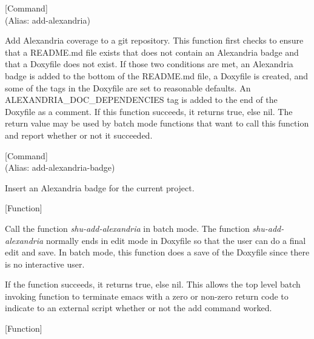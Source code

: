 \vspace{1em}
\noindent
{}
\usebox{\funcname}
 \hfill [Command]\\%
 (Alias: add-alexandria)

\begin{doc-string}
Add Alexandria coverage to a git repository.
This function first checks to ensure that a README.md file exists that does not
contain an Alexandria badge and that a Doxyfile does not exist.  If those two
conditions are met, an Alexandria badge is added to the bottom of the README.md
file, a Doxyfile is created, and some of the tags in the Doxyfile are set to
reasonable defaults.  An ALEXANDRIA\_DOC\_DEPENDENCIES tag is added to the end of
the Doxyfile as a comment.
If this function succeeds, it returns true, else nil.  The return value may
be used by batch mode functions that want to call this function and report
whether or not it succeeded.
\end{doc-string}

\vspace{1em}
\noindent
{}
\usebox{\funcname}
 \hfill [Command]\\%
 (Alias: add-alexandria-badge)

\begin{doc-string}
Insert an Alexandria badge for the current project.
\end{doc-string}

\vspace{1em}
\noindent
{}
\usebox{\funcname}
 \hfill [Function]

\begin{doc-string}
Call the function \emph{shu-add-alexandria} in batch mode.  The function
\emph{shu-add-alexandria} normally ends in edit mode in Doxyfile so that the user can
do a final edit and save.  In batch mode, this function does a save of the
Doxyfile since there is no interactive user.

If the function succeeds, it returns true, else nil.  This allows the top level
batch invoking function to terminate emacs with a zero or non-zero return code
to indicate to an external script whether or not the add command worked.
\end{doc-string}

\vspace{1em}
\noindent
{}
\usebox{\funcname}
 \hfill [Function]

